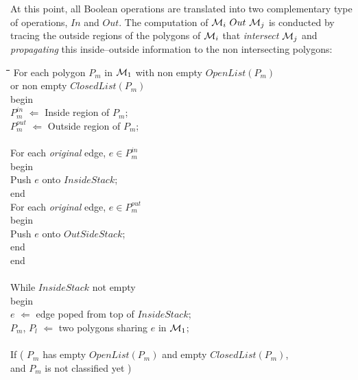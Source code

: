 At this point, all Boolean operations are translated into two complementary
type of operations, $In$ and $Out$. The computation of
${\cal M}_i \ Out \ {\cal M}_j$ is conducted by tracing the outside regions
of the polygons of ${\cal M}_i$ that {\em intersect} ${\cal M}_j$ and
{\em propagating} this inside--outside information to the non intersecting
polygons:
\begin{bf}
\begin{tt}
\begin{tabbing}
\hspace{2em}\=\hspace{2em}\=\hspace{2em}\=\hspace{2em}\=\hspace{2em}\=\kill
\> For each polygon $P_m$ in ${\cal M}_1$ with non empty $OpenList( P_m )$ \\
\> \mbox{\hspace{2.425in}} or non empty $ClosedList( P_m )$ \\
\> begin \\
\> \> $P_m^{in}$ $\Leftarrow$ Inside region of $P_m$; \\
\> \> $P_m^{out}$ $\Leftarrow$ Outside region of $P_m$; \\
\\
\> \> For each {\em original} edge, $e \in P_m^{in}$ \\
\> \> begin \\
\> \> \> Push $e$ onto $InsideStack$; \\
\> \> end \\
\> \> For each {\em original} edge, $e \in P_m^{out}$ \\
\> \> begin \\
\> \> \> Push $e$ onto $OutSideStack$; \\
\> \> end \\
\> end \\
\\
\> While $InsideStack$ not empty\\
\> begin \\
\> \> $e$ $\Leftarrow$ edge poped from top of $InsideStack$; \\
\> \> $P_m$, $P_l$ $\Leftarrow$ two polygons sharing $e$ in ${\cal M}_1$; \\
\\
\> \> If ( $P_m$ has empty $OpenList( P_m )$ and empty $ClosedList( P_m )$, \\
\> \> \mbox{\hspace{3in}} and $P_m$ is not classified yet ) \\

\end{tabbing}
\end{tt}
\end{bf}
